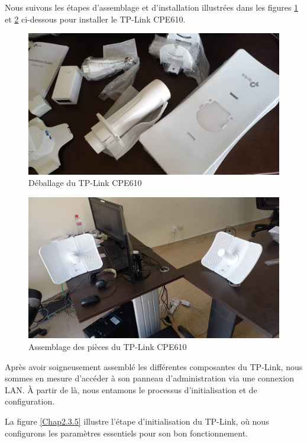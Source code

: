 Nous suivons les étapes d'assemblage et d'installation illustrées dans les figures \ref{Chap2.3.2} et \ref{Chap2.3.4} ci-dessous pour installer le TP-Link CPE610.

\begin{figure}[H]
\centering
\includegraphics[width=15cm]{Images/SetupTPL4.jpg}
\caption{Déballage du TP-Link CPE610}
\label{Chap2.3.2}
\end{figure}

\begin{figure}[H]
\centering
\includegraphics[width=15cm]{Images/SetupTPL1.jpg}
\caption{Assemblage des pièces du TP-Link CPE610}
\label{Chap2.3.4}
\end{figure}


Après avoir soigneusement assemblé les différentes composantes du TP-Link, nous sommes en mesure d'accéder à son panneau d'administration via une connexion LAN. À partir de là, nous entamons le processus d'initialisation et de configuration.

La figure \ref{Chap2.3.5} illustre l'étape d'initialisation du TP-Link, où nous configurons  les paramètres essentiels pour son bon fonctionnement.

